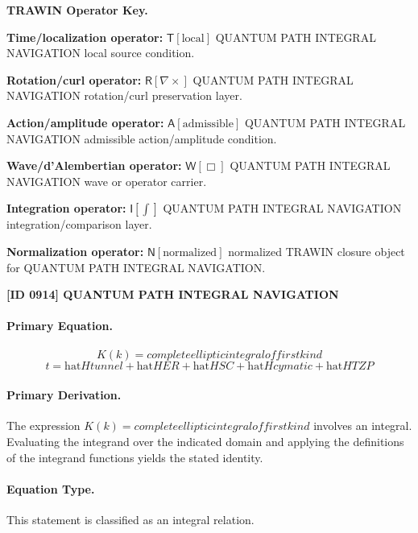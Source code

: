 \par\vspace{0.45\baselineskip}
\noindent\begin{minipage}[t]{\linewidth}
\begingroup
\small
\raggedright
\textbf{TRAWIN Operator Key.}\par
\noindent\textbf{Time/localization operator:} $\mathsf{T}\!\left[\mathrm{local}\right]$ QUANTUM PATH INTEGRAL NAVIGATION local source condition.\par
\noindent\textbf{Rotation/curl operator:} $\mathsf{R}\!\left[\nabla\times\right]$ QUANTUM PATH INTEGRAL NAVIGATION rotation/curl preservation layer.\par
\noindent\textbf{Action/amplitude operator:} $\mathsf{A}\!\left[\mathrm{admissible}\right]$ QUANTUM PATH INTEGRAL NAVIGATION admissible action/amplitude condition.\par
\noindent\textbf{Wave/d'Alembertian operator:} $\mathsf{W}\!\left[\Box\right]$ QUANTUM PATH INTEGRAL NAVIGATION wave or operator carrier.\par
\noindent\textbf{Integration operator:} $\mathsf{I}\!\left[\int\right]$ QUANTUM PATH INTEGRAL NAVIGATION integration/comparison layer.\par
\noindent\textbf{Normalization operator:} $\mathsf{N}\!\left[\mathrm{normalized}\right]$ normalized TRAWIN closure object for QUANTUM PATH INTEGRAL NAVIGATION.\par
\endgroup
\end{minipage}

\clearpage
\noindent\textbf{[ID 0914] QUANTUM PATH INTEGRAL NAVIGATION}\par
\vspace{0.35em}
\paragraph{Primary Equation.}
\[
K(k) = complete elliptic integral of first kind
\]
\[
t = \mathrm{hat}{H}tunnel + \mathrm{hat}{H}ER + \mathrm{hat}{H}SC + \mathrm{hat}{H}cymatic + \mathrm{hat}{H}TZP
\]

\paragraph{Primary Derivation.}
The expression \( K(k) = complete elliptic integral of first kind \) involves an integral. Evaluating the integrand over the indicated domain and applying the definitions of the integrand functions yields the stated identity.
\paragraph{Equation Type.}
This statement is classified as an integral relation.

